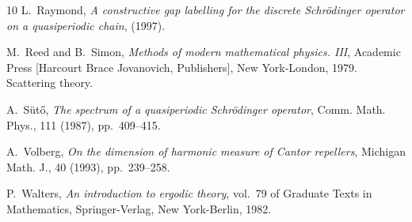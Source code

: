 \documentclass[reqno,11pt,graphicx,]{amsart}
\numberwithin{equation}{section}
\theoremstyle{plain}
\newcommand{\3}{\mathbf{3}}
\begin{document}
\begin{thebibliography}{10}
{\sc L.~Raymond}, {\em A constructive gap labelling for the discrete
  {S}chr\"odinger operator on a quasiperiodic chain},  (1997).

{\sc M.~Reed and B.~Simon}, {\em Methods of modern mathematical physics.
  {III}}, Academic Press [Harcourt Brace Jovanovich, Publishers], New
  York-London, 1979.
\newblock Scattering theory.

{\sc A.~S\"ut\H{o}}, {\em The spectrum of a quasiperiodic {S}chr\"odinger
  operator}, Comm. Math. Phys., 111 (1987), pp.~409--415.

{\sc A.~Volberg}, {\em On the dimension of harmonic measure of {C}antor
  repellers}, Michigan Math. J., 40 (1993), pp.~239--258.

{\sc P.~Walters}, {\em An introduction to ergodic theory}, vol.~79 of Graduate
  Texts in Mathematics, Springer-Verlag, New York-Berlin, 1982.

\end{thebibliography}
\end{document}
